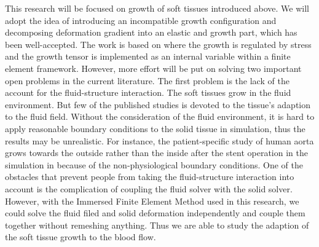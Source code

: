 This research will be focused on growth of soft tissues introduced above. We will adopt the idea of introducing an incompatible growth configuration and decomposing deformation gradient into an elastic and growth part, which has been well-accepted. The work is based on \cite{Himpel, Kuhl3, Goktepe2} where the growth is regulated by stress and the growth tensor is implemented as an internal variable within a finite element framework. However, more effort will be put on solving two important open problems in the current literature. The first problem is the lack of the account for the fluid-structure interaction. The soft tissues grow in the fluid environment. But few of the published studies is devoted to the tissue's adaption to the fluid field. Without the consideration of the fluid environment, it is hard to apply reasonable boundary conditions to the solid tissue in simulation, thus the results may be unrealistic. For instance, the patient-specific study of human aorta grows towards the outside rather than the inside after the stent operation in the simulation in \cite{Kuhl3} because of the non-physiological boundary conditions. One of the obstacles that prevent people from taking the fluid-structure interaction into account is the complication of coupling the fluid solver with the solid solver. However, with the Immersed Finite Element Method \cite{Lucy4} used in this research, we could solve the fluid filed and solid deformation independently and couple them together without remeshing anything. Thus we are able to study the adaption of the soft tissue growth to the blood flow.